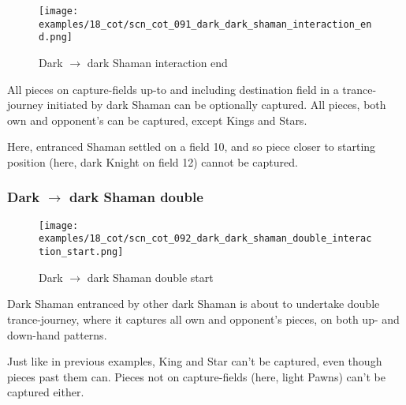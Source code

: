 \clearpage %

\noindent
\begin{figure}[!h]
\texttt{[image: examples/18\_cot/scn\_cot\_091\_dark\_dark\_shaman\_interaction\_end.png]}
\caption{Dark $\rightarrow$ dark Shaman interaction end}
\label{fig:scn_cot_091_dark_dark_shaman_interaction_end}
\end{figure}

All pieces on capture-fields up-to and including destination field in a
trance-journey initiated by dark Shaman can be optionally captured. All
pieces, both own and opponent's can be captured, except Kings and Stars.

Here, entranced Shaman settled on a field 10, and so piece closer to
starting position (here, dark Knight on field 12) cannot be captured.

\clearpage %

\subsubsection*{Dark $\rightarrow$ dark Shaman double}
\label{sec:Conquest of Tlalocan/Trance-journey/Interactions/Dark --> dark Shaman double}

\vspace*{-1.4\baselineskip}
\noindent
\begin{figure}[!h]
\texttt{[image: examples/18\_cot/scn\_cot\_092\_dark\_dark\_shaman\_double\_interaction\_start.png]}
\caption{Dark $\rightarrow$ dark Shaman double start}
\label{fig:scn_cot_092_dark_dark_shaman_double_interaction_start}
\end{figure}

Dark Shaman entranced by other dark Shaman is about to undertake double
trance-journey, where it captures all own and opponent's pieces, on both
up- and down-hand patterns.

Just like in previous examples, King and Star can't be captured, even though
pieces past them can. Pieces not on capture-fields (here, light Pawns) can't
be captured either.

\clearpage %

